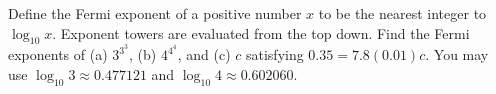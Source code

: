 Define the Fermi exponent of a positive number $x$ to be the nearest integer to $\log_{10}x$. Exponent towers are evaluated from the top down. Find the Fermi exponents of (a) $3^{3^3}$, (b) $4^{4^4}$, and (c) $c$ satisfying $0.35=7.8(0.01)c$. You may use $\log_{10}3\approx0.477121$ and $\log_{10}4\approx0.602060$.
